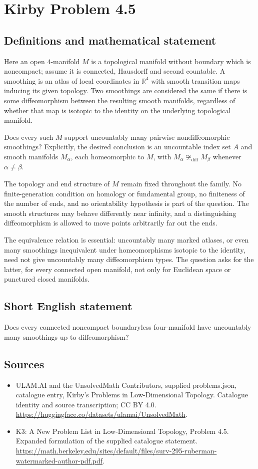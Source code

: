 \documentclass[11pt,a4paper]{article}
\begin{document}
\section*{Kirby Problem 4.5}\label{statement}

\subsection{Definitions and mathematical statement}
Here an open $4$-manifold $M$ is a topological manifold without boundary
which is noncompact; assume it is connected, Hausdorff and second
countable. A smoothing is an atlas of local coordinates in $\mathbb R^4$
with smooth transition maps inducing its given topology. Two smoothings
are considered the same if there is some diffeomorphism between the
resulting smooth manifolds, regardless of whether that map is isotopic
to the identity on the underlying topological manifold.

Does every such $M$ support uncountably many pairwise nondiffeomorphic
smoothings? Explicitly, the desired conclusion is an uncountable index
set $A$ and smooth manifolds $M_\alpha$, each homeomorphic to $M$,
with $M_\alpha\not\cong_{\mathrm{diff}}M_\beta$ whenever
$\alpha\ne\beta$.

The topology and end structure of $M$ remain fixed throughout the
family. No finite-generation condition on homology or fundamental group,
no finiteness of the number of ends, and no orientability hypothesis
is part of the question. The smooth structures may behave differently
near infinity, and a distinguishing diffeomorphism is allowed to move
points arbitrarily far out the ends.

The equivalence relation is essential: uncountably many marked atlases,
or even many smoothings inequivalent under homeomorphisms isotopic to
the identity, need not give uncountably many diffeomorphism types.
The question asks for the latter, for every connected open manifold,
not only for Euclidean space or punctured closed manifolds.
\subsection{Short English statement}
Does every connected noncompact boundaryless four-manifold have uncountably many smoothings up to diffeomorphism?
\subsection{Sources}
\begin{itemize}
\item[S1] ULAM.AI and the UnsolvedMath Contributors, supplied problems.json, catalogue entry, Kirby's Problems in Low-Dimensional Topology. Catalogue identity and source transcription; CC BY 4.0.
\url{https://huggingface.co/datasets/ulamai/UnsolvedMath}.
\item[S2] K3: A New Problem List in Low-Dimensional Topology, Problem 4.5. Expanded formulation of the supplied catalogue statement.
\url{https://math.berkeley.edu/sites/default/files/surv-295-ruberman-watermarked-author-pdf.pdf}.
\end{itemize}
\end{document}
